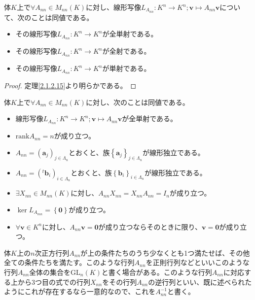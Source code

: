 \documentclass[dvipdfmx]{jsarticle}
\begin{document}
\begin{thm}\label{2.1.4.13}
体$K$上で$\forall A_{nn} \in M_{nn}(K)$に対し、線形写像$L_{A_{nn}}:K^{n} \rightarrow K^{n};\mathbf{v} \mapsto A_{nn}\mathbf{v}$について、次のことは同値である。
\begin{itemize}
\item
  その線形写像$L_{A_{nn}}:K^{n} \rightarrow K^{n}$が全単射である。
\item
  その線形写像$L_{A_{nn}}:K^{n} \rightarrow K^{n}$が全射である。
\item
  その線形写像$L_{A_{nn}}:K^{n} \rightarrow K^{n}$が単射である。
\end{itemize}
\end{thm}
\begin{proof}
定理\ref{2.1.2.15}より明らかである。
\end{proof}
\begin{thm}\label{2.1.4.14}
体$K$上で$\forall A_{nn} \in M_{nn}(K)$に対し、次のことは同値である。
\begin{itemize}
\item
  線形写像$L_{A_{nn}}:K^{n} \rightarrow K^{n};\mathbf{v} \mapsto A_{nn}\mathbf{v}$が全単射である。
\item
  ${\mathrm{rank} }A_{nn} = n$が成り立つ。
\item
  $A_{nn} = \left( \mathbf{a}_{j} \right)_{j \in \varLambda_{n}}$とおくと、族$\left\{ \mathbf{a}_j \right\}_{j \in \varLambda_{n} } $が線形独立である。
\item
  $A_{nn} = \left(^{t}\mathbf{b}_{i} \right)_{i \in \varLambda_{n}}$とおくと、族$\left\{ \mathbf{b}_i \right\}_{i \in \varLambda_{n} } $が線形独立である。
\item
  $\exists X_{nn} \in M_{nn}(K)$に対し、$A_{nn}X_{nn} = X_{nn}A_{nn} = I_{n}$が成り立つ。
\item
  $\ker L_{A_{mn}} = \left\{ \mathbf{0} \right\}$が成り立つ。
\item
  $\forall\mathbf{v} \in K^{n}$に対し、$A_{nn}\mathbf{v} = \mathbf{0}$が成り立つならそのときに限り、$\mathbf{v} = \mathbf{0}$が成り立つ。
\end{itemize}
\end{thm}
\begin{dfn}\label{正則行列}
体$K$上の$n$次正方行列$A_{nn}$が上の条件たちのうち少なくとも1つ満たせば、その他全ての条件たちを満たす。このような行列$A_{nn}$を正則行列などといいこのような行列$A_{nn}$全体の集合を$\mathrm{GL}_{n}(K)$と書く場合がある。このような行列$A_{nn}$に対応する上から3つ目の式での行列$X_{nn}$をその行列$A_{nn}$の逆行列といい、既に述べられたようにこれが存在するなら一意的なので、これを$A_{nn}^{-1}$と書く。
\end{dfn}
\end{document}
